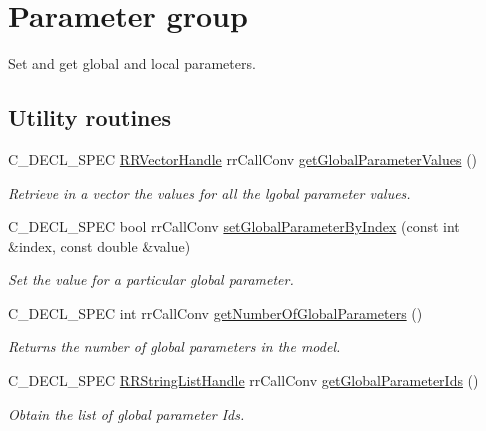 \hypertarget{group__parameters}{
\section{\-Parameter group}
\label{group__parameters}
}


\-Set and get global and local parameters.  


\subsection*{\-Utility routines}
\begin{DoxyCompactItemize}
\item 
\-C\-\_\-\-D\-E\-C\-L\-\_\-\-S\-P\-E\-C \hyperlink{rr__c__types_8h_aea46a16752b0ae2cd95c009030ee630e}{\-R\-R\-Vector\-Handle} \*
rr\-Call\-Conv \hyperlink{group__utility_gaf4be0a5e72db408248569a1d3e28c1f0}{get\-Global\-Parameter\-Values} ()
\begin{DoxyCompactList}\small\item\em \-Retrieve in a vector the values for all the lgobal parameter values. \end{DoxyCompactList}\item 
\-C\-\_\-\-D\-E\-C\-L\-\_\-\-S\-P\-E\-C bool rr\-Call\-Conv \hyperlink{group__utility_ga65d9546856e5526fc403539903039f8e}{set\-Global\-Parameter\-By\-Index} (const int \&index, const double \&value)
\begin{DoxyCompactList}\small\item\em \-Set the value for a particular global parameter. \end{DoxyCompactList}\item 
\hypertarget{group__utility_ga2f33a70dfd6c68fb585cf5d1a9c1339c}{
\-C\-\_\-\-D\-E\-C\-L\-\_\-\-S\-P\-E\-C int rr\-Call\-Conv \hyperlink{group__utility_ga2f33a70dfd6c68fb585cf5d1a9c1339c}{get\-Number\-Of\-Global\-Parameters} ()}
\label{group__utility_ga2f33a70dfd6c68fb585cf5d1a9c1339c}

\begin{DoxyCompactList}\small\item\em \-Returns the number of global parameters in the model. \end{DoxyCompactList}\item 
\-C\-\_\-\-D\-E\-C\-L\-\_\-\-S\-P\-E\-C \hyperlink{rr__c__types_8h_abf561b014879247b7b92ee99c205de21}{\-R\-R\-String\-List\-Handle} \*
rr\-Call\-Conv \hyperlink{group__utility_gad54bc548747794f11d90f2150a1c621d}{get\-Global\-Parameter\-Ids} ()
\begin{DoxyCompactList}\small\item\em \-Obtain the list of global parameter \-Ids. \end{DoxyCompactList}\end{DoxyCompactItemize}


